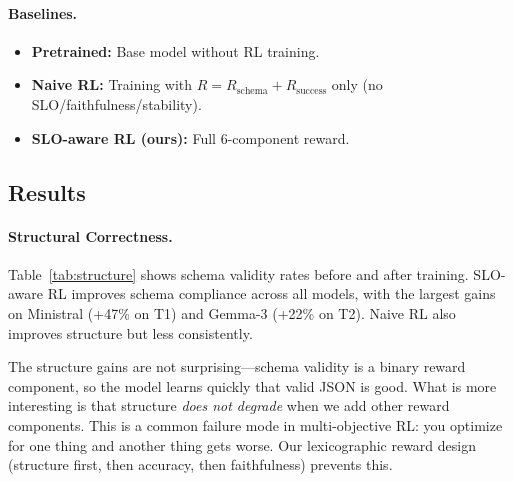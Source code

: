 \documentclass[11pt]{article}
\begin{document}
\paragraph{Baselines.}
\begin{itemize}[leftmargin=12pt]
    \item \textbf{Pretrained:} Base model without RL training.
    \item \textbf{Naive RL:} Training with $R = R_{\text{schema}} + R_{\text{success}}$ only (no SLO/faithfulness/stability).
    \item \textbf{SLO-aware RL (ours):} Full 6-component reward.
\end{itemize}

\subsection{Results}

\paragraph{Structural Correctness.}
Table~\ref{tab:structure} shows schema validity rates before and after training.
SLO-aware RL improves schema compliance across all models, with the largest gains on Ministral (+47\% on T1) and Gemma-3 (+22\% on T2).
Naive RL also improves structure but less consistently.

The structure gains are not surprising---schema validity is a binary reward component, so the model learns quickly that valid JSON is good.
What is more interesting is that structure \emph{does not degrade} when we add other reward components.
This is a common failure mode in multi-objective RL: you optimize for one thing and another thing gets worse.
Our lexicographic reward design (structure first, then accuracy, then faithfulness) prevents this.
\end{document}
